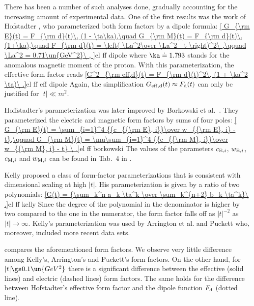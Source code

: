 There has been a number of such analyses done, gradually accounting for the increasing amount of experimental data. One of the first results was the work of Hofstadter , who parameterized both form factors by a dipole formula:
\eqref{
	G_{\rm E}(t) = F_{\rm d}(t)\, (1 - \ta\ka),\quad
	G_{\rm M}(t) = F_{\rm d}(t)\, (1+\ka),\quad
	F_{\rm d}(t) = \left( \La^2\over \La^2 - t \right)^2\ ,\qquad
	\La^2 = 0.71\un{GeV^2}\ ,
}{el ff dipole}
where $\ka\doteq 1.793$ stands for the anomalous magnetic moment of the proton. With this parameterization, the effective form factor reads
\eqref{G^2_{\rm eff,d}(t) = F_{\rm d}(t)^2\, (1 + \ka^2 \ta)\ .}{el ff eff dipole}
Again, the simplification $G_{\rm eff,d}(t)\approx F_{\rm d}(t)$ can only be justified for $|t| \ll m^2$.

Hoffstadter's parameterization was later improved by Borkowski et al.~. They parameterized the electric and magnetic form factors by sums of four poles:
\eqref{
G_{\rm E}(t) = \sum_{i=1}^4 {{c_{{\rm E}, i}}\over w_{{\rm E}, i} - t},\qquad
G_{\rm M}(t) = \mu\sum_{i=1}^4 {{c_{{\rm M}, i}}\over w_{{\rm M}, i} - t}
\ .}{el ff borkowski}
The values of the parameters $c_{{\rm E}, i}$, $w_{{\rm E}, i}$, $c_{{\rm M}, i}$ and $w_{{\rm M}, i}$ can be found in Tab.~4 in .

Kelly  proposed a class of form-factor parameterizations that is consistent with dimensional scaling at high $|t|$. His parameterization is given by a ratio of two polynomials:
\eqref{G(t) = {\sum_k^n a_k \ta^k \over \sum_k^{n+2} b_k \ta^k}\ .}{el ff kelly}
Since the degree of the polynomial in the denominator is higher by two compared to the one in the numerator, the form factor falls off as $|t|^{-2}$ as $|t|\to\infty$. Kelly's parameterization was used by Arrington et al.  and Puckett  who, moreover, included more recent data sets.

 compares the aforementioned form factors. We observe very little difference among Kelly's, Arrington's and Puckett's form factors. On the other hand, for $|t| \gs 0.1\un{GeV^2}$ there is a significant difference between the effective (solid lines) and electric (dashed lines) form factors. The same holds for the difference between Hofstadter's effective form factor and the dipole function $F_{\rm d}$ (dotted line).



